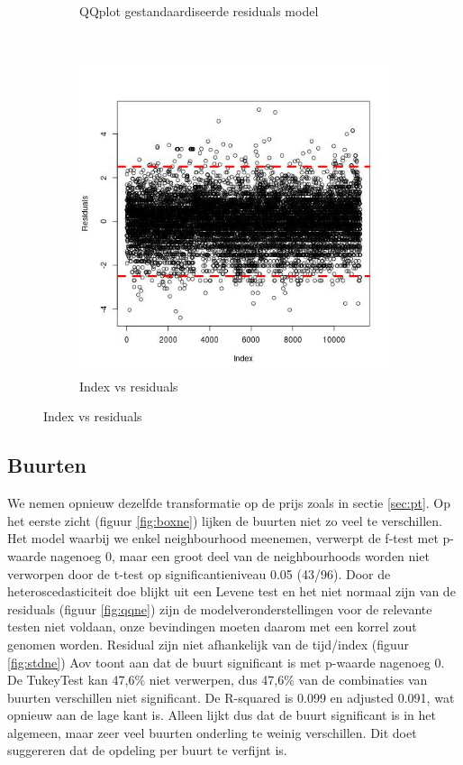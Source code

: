 \documentclass[a4paper,kulak]{kulakarticle} %
\begin{document}
\begin{figure}[H]
\begin{subfigure}[b]{0.3\textwidth}
		\caption{QQplot gestandaardiseerde residuals model}
		\label{fig:qqboxcit}
	\end{subfigure}
	~
	\begin{subfigure}[b]{0.3\textwidth}
		\includegraphics[width=\textwidth]{indc.jpg}
		\caption{Index vs residuals}
		\label{fig:indc}
	\end{subfigure}
\end{figure}

\subsection{Buurten}
We nemen opnieuw dezelfde transformatie op de prijs zoals in sectie \ref{sec:pt}.
Op het eerste zicht (figuur \ref{fig:boxne}) lijken de buurten niet zo veel te verschillen.
Het model waarbij we enkel neighbourhood meenemen, verwerpt de f-test met p-waarde nagenoeg 0, maar een groot deel van de neighbourhoods worden niet verworpen door de t-test op significantieniveau 0.05 (43/96). 
Door de heteroscedasticiteit doe blijkt uit een Levene test en het niet normaal zijn van de residuals (figuur \ref{fig:qqne}) zijn de modelveronderstellingen voor de relevante testen niet voldaan, onze bevindingen moeten daarom met een korrel zout genomen worden.
Residual zijn niet afhankelijk van de tijd/index (figuur \ref{fig:stdne})
Aov toont aan dat de buurt significant is met p-waarde nagenoeg 0.
De TukeyTest kan 47,6\% niet verwerpen, dus 47,6\% van de combinaties van buurten verschillen niet significant.
De R-squared is 0.099 en adjusted 0.091, wat opnieuw aan de lage kant is.
Alleen lijkt dus dat de buurt significant is in het algemeen, maar zeer veel buurten onderling te weinig verschillen.
Dit doet suggereren dat de opdeling per buurt te verfijnt is.
\end{document}
